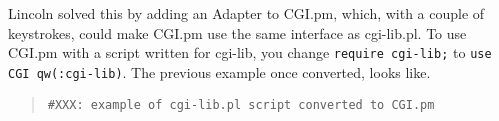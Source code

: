 Lincoln solved this by adding an Adapter to CGI.pm, which, with a 
couple of keystrokes, could make CGI.pm use the same interface as
cgi-lib.pl.  To use CGI.pm with a script written for cgi-lib, you
change {\tt require cgi-lib;} to {\tt use CGI qw(:cgi-lib)}.  The
previous example once converted, looks like.

\begin{quote}
\begin{verbatim}
#XXX: example of cgi-lib.pl script converted to CGI.pm
\end{verbatim}
\end{quote}


